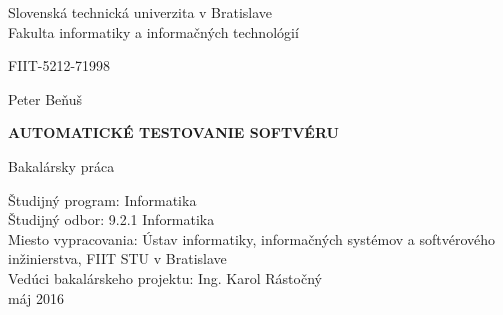 \documentclass[11pt,twoside,slovak,a4paper]{article}
\begin{document}
	
	\begin{titlepage}
		\centering
		\newlength{\myind}
		\addtolength{\myind}{57mm}
		
		\newlength{\myrulelength}
		\addtolength{\myrulelength}{\textwidth}
		\newcommand{\myrule}{\parbox{\myrulelength}{\hrulefill}}
		\newcommand{\mybox}[1]{\parbox{\myrulelength}{#1}}
		\newcommand{\mycbox}[1]{\parbox{\myrulelength}{\centering #1}}
		
		\begin{center}
			\large 		Slovenská technická univerzita v Bratislave\\
			Fakulta informatiky a informačných technológií	
		\end{center}

		
		\myrule
		
		\begin{center}
			FIIT-5212-71998
		\end{center}
		
		\vspace{40mm}
		
		\mycbox{Peter Beňuš}
		
		\vspace{10mm}
		
		\mycbox{\LARGE \textbf{ \MakeUppercase {Automatické testovanie softvéru}}}
		
		\vspace{4mm}
		\mycbox{\large Bakalársky práca}
		
		
		\vfill
		\begin{flushleft}
			Študijný program: Informatika\\
			Študijný odbor: 9.2.1 Informatika\\
			Miesto vypracovania: Ústav informatiky, informačných systémov a softvérového inžinierstva, FIIT STU v Bratislave\\
			Vedúci bakalárskeho projektu: Ing. Karol Rástočný\\
			máj 2016
		\end{flushleft}
	\end{titlepage}
	
\end{document}
